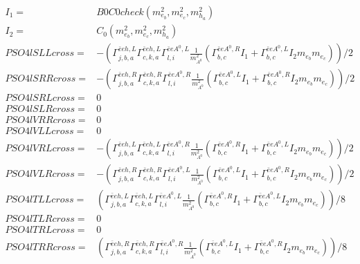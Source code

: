 \documentclass[A4,landscape]{article}
\begin{document}
\begin{align} 
I_1= & B0C0check(m^2_{e_{{b}}}, m^2_{e_{{c}}}, m^2_{h_{{a}}}) \\ 
I_2= & C_0(m^2_{e_{{b}}}, m^2_{e_{{c}}}, m^2_{h_{{a}}}) \\ 
  PSO4lSLLcross= & -( \Gamma^{\bar{e}e h ,L}_{j, b, a} \Gamma^{\bar{e}e h ,L}_{c, k, a} \Gamma^{\bar{e}e A^0 ,L}_{l, i} \frac{1}{m^2_{A^0}} (\Gamma^{\bar{e}e A^0 ,R}_{b, c} I_1 + \Gamma^{\bar{e}e A^0 ,L}_{b, c} I_2 m_{e_{{b}}} m_{e_{{c}}}))/2 \\ 
  PSO4lSRRcross= & -( \Gamma^{\bar{e}e h ,R}_{j, b, a} \Gamma^{\bar{e}e h ,R}_{c, k, a} \Gamma^{\bar{e}e A^0 ,R}_{l, i} \frac{1}{m^2_{A^0}} (\Gamma^{\bar{e}e A^0 ,L}_{b, c} I_1 + \Gamma^{\bar{e}e A^0 ,R}_{b, c} I_2 m_{e_{{b}}} m_{e_{{c}}}))/2 \\ 
  PSO4lSRLcross= & 0 \\ 
  PSO4lSLRcross= & 0 \\ 
  PSO4lVRRcross= & 0 \\ 
  PSO4lVLLcross= & 0 \\ 
  PSO4lVRLcross= & -( \Gamma^{\bar{e}e h ,L}_{j, b, a} \Gamma^{\bar{e}e h ,L}_{c, k, a} \Gamma^{\bar{e}e A^0 ,R}_{l, i} \frac{1}{m^2_{A^0}} (\Gamma^{\bar{e}e A^0 ,R}_{b, c} I_1 + \Gamma^{\bar{e}e A^0 ,L}_{b, c} I_2 m_{e_{{b}}} m_{e_{{c}}}))/2 \\ 
  PSO4lVLRcross= & -( \Gamma^{\bar{e}e h ,R}_{j, b, a} \Gamma^{\bar{e}e h ,R}_{c, k, a} \Gamma^{\bar{e}e A^0 ,L}_{l, i} \frac{1}{m^2_{A^0}} (\Gamma^{\bar{e}e A^0 ,L}_{b, c} I_1 + \Gamma^{\bar{e}e A^0 ,R}_{b, c} I_2 m_{e_{{b}}} m_{e_{{c}}}))/2 \\ 
  PSO4lTLLcross= & ( \Gamma^{\bar{e}e h ,L}_{j, b, a} \Gamma^{\bar{e}e h ,L}_{c, k, a} \Gamma^{\bar{e}e A^0 ,L}_{l, i} \frac{1}{m^2_{A^0}} (\Gamma^{\bar{e}e A^0 ,R}_{b, c} I_1 + \Gamma^{\bar{e}e A^0 ,L}_{b, c} I_2 m_{e_{{b}}} m_{e_{{c}}}))/8 \\ 
  PSO4lTLRcross= & 0 \\ 
  PSO4lTRLcross= & 0 \\ 
  PSO4lTRRcross= & ( \Gamma^{\bar{e}e h ,R}_{j, b, a} \Gamma^{\bar{e}e h ,R}_{c, k, a} \Gamma^{\bar{e}e A^0 ,R}_{l, i} \frac{1}{m^2_{A^0}} (\Gamma^{\bar{e}e A^0 ,L}_{b, c} I_1 + \Gamma^{\bar{e}e A^0 ,R}_{b, c} I_2 m_{e_{{b}}} m_{e_{{c}}}))/8 \\ 
\end{align} 
\end{document}
